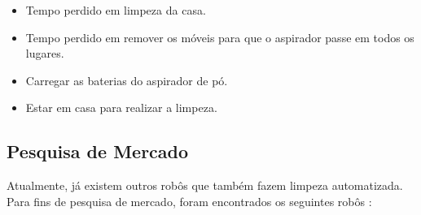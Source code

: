 \begin{itemize}
	\item Tempo perdido em limpeza da casa.
	\item Tempo perdido em remover os móveis para que o aspirador passe em todos os lugares.
	\item Carregar as baterias do aspirador de pó.
	\item Estar em casa para realizar a limpeza.
\end{itemize}



\subsection{Pesquisa de Mercado} %
\label{sub:pesquisa_de_mercado}

	Atualmente, já existem outros robôs que também fazem limpeza automatizada. Para fins de pesquisa de mercado, foram encontrados os seguintes robôs \cite{techtudo}:

